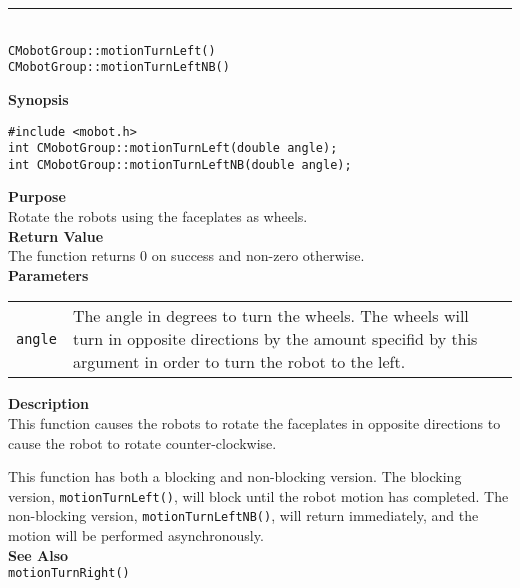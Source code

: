 \noindent
\vspace{5pt}
\rule{4.5in}{0.015in}\\
\noindent
{\LARGE \texttt{CMobotGroup::motionTurnLeft()}}\\
{\LARGE \texttt{CMobotGroup::motionTurnLeftNB()}}\\
{}

\noindent
{\bf Synopsis}
\vspace{-8pt}
\begin{verbatim}
#include <mobot.h>
int CMobotGroup::motionTurnLeft(double angle);
int CMobotGroup::motionTurnLeftNB(double angle);
\end{verbatim}

\noindent
{\bf Purpose}\\
Rotate the robots using the faceplates as wheels.\\

\noindent
{\bf Return Value}\\
The function returns 0 on success and non-zero otherwise.\\

\noindent
{\bf Parameters}\\
\vspace{-0.1in}
\begin{description}
\item               
\begin{tabular}{p{10 mm}p{145 mm}}
\texttt{angle} & The angle in degrees to turn the wheels. The wheels will turn in opposite directions by the amount specifid by this argument in order to turn the robot to the left. \\
\end{tabular}
\end{description}

\noindent
{\bf Description}\\
This function causes the robots to rotate the faceplates in opposite directions
to cause the robot to rotate counter-clockwise.

This function has both a blocking and non-blocking version.
The blocking version, \texttt{motionTurnLeft()}, will block until the
robot motion has completed. The non-blocking version, \texttt{motionTurnLeftNB()},
will return immediately, and the motion will be performed asynchronously.\\


\noindent
{\bf See Also}\\
\texttt{motionTurnRight()}

